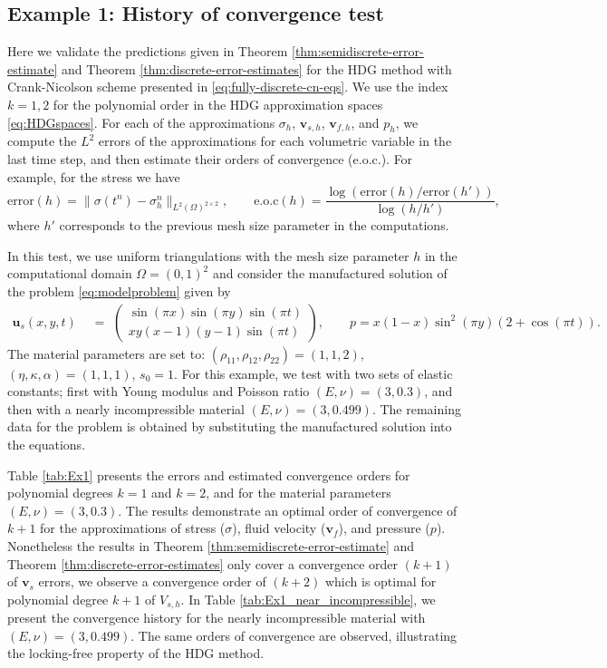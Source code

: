 \documentclass[10pt,letterpaper]{amsart}
\theoremstyle{plain} %
\theoremstyle{remark} %
\newcommand{\vect}[1]{\mathbf{#1}}
\begin{document}
\subsection*{Example 1: History of convergence test}\label{convergenceexamples}
Here we validate the predictions given in Theorem \ref{thm:semidiscrete-error-estimate} and Theorem \ref{thm:discrete-error-estimates} for the HDG method with Crank-Nicolson scheme presented in \eqref{eq:fully-discrete-cn-eqs}. We use the index $k=1,2$ for the polynomial order in the HDG approximation spaces \eqref{eq:HDGspaces}. For each of the approximations $\sigma_{h}$, $\vect{v}_{s,h}$, $\vect{v}_{f,h}$, and $p_{h}$, we compute the $L^{2}$ errors of the approximations for each volumetric variable in the last time step, and then estimate their orders of convergence (e.o.c.). For example, for the stress we have
\[
\mbox{error}(h)=  \| \sigma(t^{n}) - \sigma_{h}^{n}\|_{L^{2}(\Omega)^{2\times 2}},\qquad \mbox{e.o.c}(h) = \frac{ \log( \mbox{error}(h) / \mbox{error}(h')  )}{ \log(h / h')  },
\]
where $h'$ corresponds to the previous mesh size parameter in the computations. 

In this test, we use uniform triangulations with the mesh size parameter $h$ in the computational domain $\Omega=(0,1)^2$ and consider the manufactured solution of the problem \eqref{eq:modelproblem}  given by
\begin{align*}
\vect{u}_{s}(x,y,t) \,\,&=\,\, 
\begin{pmatrix}
    \sin(\pi x) \sin(\pi y)\sin(\pi t) \\
    x y (x - 1) (y - 1)\sin(\pi t)
\end{pmatrix},
\qquad 
  p = x(1 - x)\sin^{2}(\pi y)(2+\cos(\pi t)).
\end{align*}
The material parameters are set to: $ (\rho_{11},\rho_{12}, \rho_{22}) =(1, 1, 2)$,  $(\eta, \kappa, \alpha) = (1,1,1)$, $s_0=1$.  For this example, we test with two sets of elastic constants; first with Young modulus and Poisson ratio $(E, \nu)=(3,0.3)$, and then with a nearly incompressible material $(E, \nu) = (3, 0.499)$. The remaining data for the problem is obtained by substituting the manufactured solution into the equations.

Table \ref{tab:Ex1} presents the errors and estimated convergence orders for polynomial degrees $k=1$ and $k=2$, and for the material parameters $(E, \nu) = (3, 0.3)$.  The results demonstrate an optimal order of convergence of $k+1$ for the approximations of stress ($\sigma$), fluid velocity ($\vect{v}_{f}$), and pressure ($p$). Nonetheless the results in Theorem \ref{thm:semidiscrete-error-estimate} and Theorem \ref{thm:discrete-error-estimates} only cover a convergence order $(k+1)$ of $\vect{v}_s$ errors, we observe a convergence order of $(k+2)$ which is optimal for polynomial degree $k+1$ of $V_{s,h}$.  In Table \ref{tab:Ex1_near_incompressible}, we present the convergence history for the nearly incompressible material with $(E, \nu) = (3, 0.499)$. The same orders of convergence are observed, illustrating the locking-free property of the HDG method.
\end{document}
